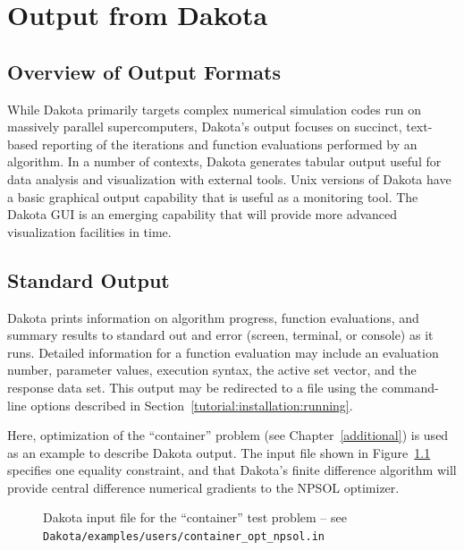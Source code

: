 \chapter{Output from Dakota}\label{output}

\section{Overview of Output Formats}\label{output:overview}

While Dakota primarily targets complex numerical simulation codes run
on massively parallel supercomputers, Dakota's output focuses on
succinct, text-based reporting of the iterations and function
evaluations performed by an algorithm. In a number of contexts, Dakota
generates tabular output useful for data analysis and visualization
with external tools.  Unix versions of Dakota have a basic graphical
output capability that is useful as a monitoring tool.  The Dakota
GUI is an emerging capability that will provide more advanced
visualization facilities in time.

\section{Standard Output}\label{output:standard}

Dakota prints information on algorithm progress, function evaluations,
and summary results to standard out and error (screen, terminal, or
console) as it runs.  Detailed information for a function evaluation
may include an evaluation number, parameter values, execution syntax,
the active set vector, and the response data set.  This output may be
redirected to a file using the command-line options described in
Section~\ref{tutorial:installation:running}.

Here, optimization of the ``container'' problem (see
Chapter~\ref{additional}) is used as an example to describe Dakota
output. The input file shown in Figure~\ref{output:incont} specifies
one equality constraint, and that Dakota's finite difference algorithm
will provide central difference numerical gradients to the NPSOL
optimizer.
\begin{figure}
  \begin{small}
    \begin{bigbox}
    \end{bigbox}
  \end{small}
  \caption{Dakota input file for the ``container'' test problem --
see \texttt{Dakota/examples/users/container\_opt\_npsol.in} }
  \label{output:incont}
\end{figure}

